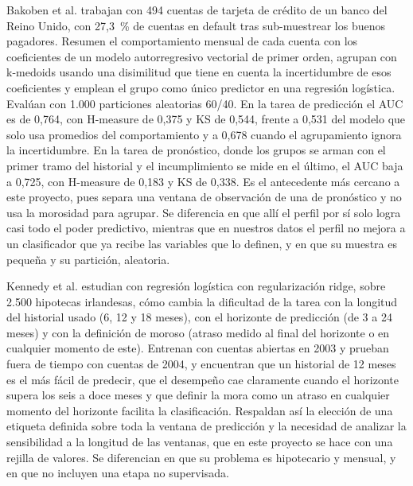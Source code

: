 \documentclass[journal]{IEEEtran}
\begin{document}
Bakoben et al. \cite{bakoben2020} trabajan con 494 cuentas de tarjeta de crédito de un banco del Reino Unido, con 27,3~\% de cuentas en default tras sub-muestrear los buenos pagadores. Resumen el comportamiento mensual de cada cuenta con los coeficientes de un modelo autorregresivo vectorial de primer orden, agrupan con k-medoids usando una disimilitud que tiene en cuenta la incertidumbre de esos coeficientes y emplean el grupo como único predictor en una regresión logística. Evalúan con 1.000 particiones aleatorias 60/40. En la tarea de predicción el AUC es de 0,764, con H-measure de 0,375 y KS de 0,544, frente a 0,531 del modelo que solo usa promedios del comportamiento y a 0,678 cuando el agrupamiento ignora la incertidumbre. En la tarea de pronóstico, donde los grupos se arman con el primer tramo del historial y el incumplimiento se mide en el último, el AUC baja a 0,725, con H-measure de 0,183 y KS de 0,338. Es el antecedente más cercano a este proyecto, pues separa una ventana de observación de una de pronóstico y no usa la morosidad para agrupar. Se diferencia en que allí el perfil por sí solo logra casi todo el poder predictivo, mientras que en nuestros datos el perfil no mejora a un clasificador que ya recibe las variables que lo definen, y en que su muestra es pequeña y su partición, aleatoria.

Kennedy et al. \cite{kennedy2013} estudian con regresión logística con regularización ridge, sobre 2.500 hipotecas irlandesas, cómo cambia la dificultad de la tarea con la longitud del historial usado (6, 12 y 18 meses), con el horizonte de predicción (de 3 a 24 meses) y con la definición de moroso (atraso medido al final del horizonte o en cualquier momento de este). Entrenan con cuentas abiertas en 2003 y prueban fuera de tiempo con cuentas de 2004, y encuentran que un historial de 12 meses es el más fácil de predecir, que el desempeño cae claramente cuando el horizonte supera los seis a doce meses y que definir la mora como un atraso en cualquier momento del horizonte facilita la clasificación. Respaldan así la elección de una etiqueta definida sobre toda la ventana de predicción y la necesidad de analizar la sensibilidad a la longitud de las ventanas, que en este proyecto se hace con una rejilla de valores. Se diferencian en que su problema es hipotecario y mensual, y en que no incluyen una etapa no supervisada.
\end{document}
